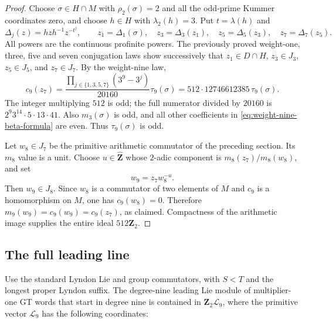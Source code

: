 \begin{proof}
Choose $\sigma\in H\cap M$ with $\rho_2(\sigma)=2$ and all the
odd-prime Kummer coordinates zero, and choose $h\in H$ with
$\lambda_2(h)=3$. Put $t=\lambda(h)$ and
\[
 \Delta_j(z)=hzh^{-1}z^{-t^j},\qquad
 z_1=\Delta_1(\sigma),\quad z_3=\Delta_3(z_1),\quad
 z_5=\Delta_5(z_3),\quad z_7=\Delta_7(z_5).
\]
All powers are the continuous profinite powers. The previously
proved weight-one, three, five and seven conjugation laws show
successively that $z_1\in D\cap H$, $z_3\in J_3$, $z_5\in J_5$,
and $z_7\in J_7$. By the weight-nine law,
\[
 c_9(z_7)=\frac{\prod_{j\in\{1,3,5,7\}}(3^9-3^j)}{20160}
                          \tau_9(\sigma)
        =512\cdot12746612385\,\tau_9(\sigma).
\]
The integer multiplying $512$ is odd; the full numerator divided
by $20160$ is $2^9 3^{14}\cdot5\cdot13\cdot41$.
Also $m_3(\sigma)$ is odd, and all other coefficients in
\eqref{eq:weight-nine-beta-formula} are even. Thus
$\tau_9(\sigma)$ is odd.

Let $w_8\in J_7$ be the primitive arithmetic commutator of the
preceding section. Its $m_8$ value is a unit. Choose
$u\in\widehat{\mathbf Z}$ whose $2$-adic component is
$m_8(z_7)/m_8(w_8)$, and set
\[
 w_9=z_7w_8^{-u}.
\]
Then $w_9\in J_8$. Since $w_8$ is a commutator of two elements of
$M$ and $c_9$ is a homomorphism on $M$, one has $c_9(w_8)=0$.
Therefore $m_9(w_9)=c_9(w_9)=c_9(z_7)$, as claimed. Compactness
of the arithmetic image supplies the entire ideal
$512\mathbf Z_2$.
\end{proof}

\subsection{The full leading line}

Use the standard Lyndon Lie and group commutators, with $S<T$ and
the longest proper Lyndon suffix. The degree-nine leading Lie
module of multiplier-one GT words that start in degree nine is contained
in $\mathbf Z_2\mathcal L_9$, where the primitive vector
$\mathcal L_9$ has the following coordinates:

